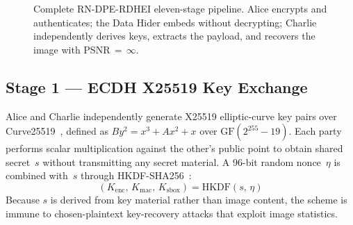 \documentclass[runningheads]{llncs}
\begin{document}
\begin{figure}[t]
\caption{Complete RN-DPE-RDHEI eleven-stage pipeline.
Alice encrypts and authenticates; the Data Hider embeds
without decrypting; Charlie independently derives keys,
extracts the payload, and recovers the image with
PSNR\,$=$\,$\infty$.}
\label{fig:pipeline}
\end{figure}

\subsection{Stage 1 — ECDH X25519 Key Exchange}
Alice and Charlie independently generate X25519 elliptic-curve
key pairs over Curve25519~\cite{ref7}, defined as
$By^2 = x^3 + Ax^2 + x$ over $\mathrm{GF}(2^{255}-19)$.
Each party performs scalar multiplication against the
other's public point to obtain shared secret~$s$ without
transmitting any secret material. A 96-bit random nonce~$\eta$
is combined with~$s$ through HKDF-SHA256~\cite{ref8}:
\begin{equation}
(K_\text{enc},\,K_\text{mac},\,K_\text{sbox}) = \mathrm{HKDF}(s,\,\eta)
\label{eq:hkdf}
\end{equation}
Because $s$ is derived from key material rather than image
content, the scheme is immune to chosen-plaintext
key-recovery attacks that exploit image statistics.
\end{document}
